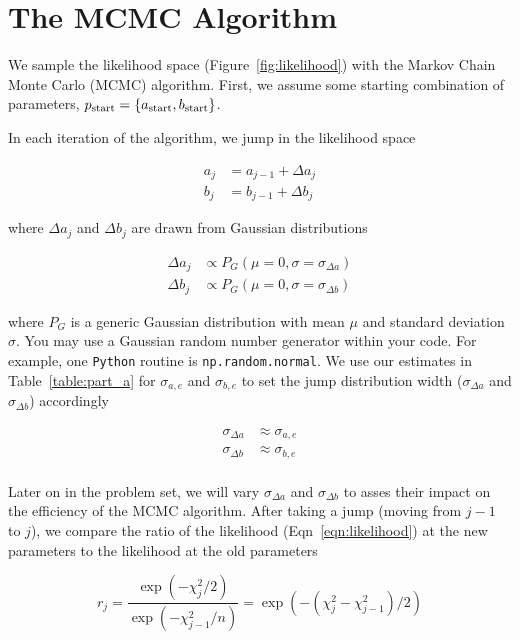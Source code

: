 \documentclass[iop,floatfix]{emulateapj}
\begin{document}
\section{The MCMC Algorithm}

We sample the likelihood space (Figure~\ref{fig:likelihood}) with the Markov Chain Monte Carlo (MCMC) algorithm. First, we assume some starting combination of parameters, $p_{\rm start} = \{a_{\rm start}, b_{\rm start}\}$.

In each iteration of the algorithm, we jump in the likelihood space 

\begin{eqnarray}
  a_j &= a_{j-1} + \Delta a_j \\
  b_j &= b_{j-1} + \Delta b_j
\end{eqnarray}

where $\Delta a_j$ and $\Delta b_j$ are drawn from Gaussian distributions

\begin{eqnarray}
  \Delta a_j &\propto P_G(\mu = 0, \sigma = \sigma_{\Delta a})\\
  \Delta b_j &\propto P_G(\mu = 0, \sigma = \sigma_{\Delta b})
\end{eqnarray}

where $P_G$ is a generic Gaussian distribution with mean $\mu$ and standard deviation $\sigma$. You may use a Gaussian random number generator within your code. For example, one \verb|Python| routine is \verb|np.random.normal|. We use our estimates in Table~\ref{table:part_a} for $\sigma_{a,e}$ and $\sigma_{b,e}$ to set the jump distribution width ($\sigma_{\Delta a}$ and $\sigma_{\Delta b}$) accordingly

\begin{eqnarray}
  \sigma_{\Delta a} &\approx \sigma_{a,e}\\
  \sigma_{\Delta b} &\approx \sigma_{b,e}\\
\end{eqnarray}

Later on in the problem set, we will vary $\sigma_{\Delta a}$ and $\sigma_{\Delta b}$ to asses their impact on the efficiency of the MCMC algorithm. After taking a jump (moving from $j -1 $ to $j$), we compare the ratio of the likelihood (Eqn~\ref{eqn:likelihood}) at the new parameters to the likelihood at the old parameters

\begin{equation}
  r_j = \frac{\exp(-\chi_j^2 / 2)}{\exp(-\chi_{j-1}^2/n)} = \exp(-(\chi^2_j - \chi^2_{j-1})/2)
\end{equation}
\end{document}
